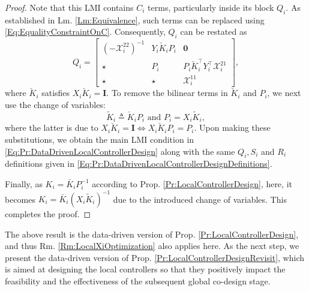 \documentclass[letterpaper, 10 pt, conference]{ieeeconf}%
\newcommand{\T}{\top}
\newcommand{\I}{\mathbf{I}}
\newcommand{\0}{\mathbf{0}}
\newcommand{\X}{\mathcal{X}}
\newcommand{\bm}[1]{\begin{bmatrix}#1\end{bmatrix}}
\begin{document}
\begin{proof}
Note that this LMI contains $C_i$ terms, particularly inside its block $Q_i$. As established in Lm. \ref{Lm:Equivalence}, such terms can be replaced using \eqref{Eq:EqualityConstraintOnC}. Consequently, $Q_i$ can be restated as   
$$
Q_i =  
\bm{ 
(-\X_i^{22})^{-1} & Y_i \check{K}_iP_i & \0 \\
\star & P_i  & P_i \check{K}_i^\T Y_i^\T \X^{21}_i\\
\star & \star & \X^{11}_i }, 
$$
where $\check{K}_i$ satisfies $X_i \check{K}_i = \I$. To remove the bilinear terms in $\check{K}_i$ and $P_i$, we next use the change of variables: 
$$
\tilde{K}_i \triangleq \check{K}_i P_i \mbox{ and } P_i = X_i \tilde{K}_i,
$$
where the latter is due to $X_i \check{K}_i = \I \iff X_i \check{K}_i P_i = P_i$. Upon making these substitutions, we obtain the main LMI condition in \eqref{Eq:Pr:DataDrivenLocalControllerDesign} along with the same $Q_i, S_i$ and $R_i$ definitions given in \eqref{Eq:Pr:DataDrivenLocalControllerDesignDefinitions}. 

Finally, as $K_i = \bar{K}_i P_i^{-1}$ according to Prop. \ref{Pr:LocalControllerDesign}, here, it becomes $K_i = \bar{K}_i (X_i \tilde{K}_i)^{-1}$ due to the introduced change of variables. This completes the proof.
\end{proof}
 

The above result is the data-driven version of Prop. \ref{Pr:LocalControllerDesign}, and thus Rm. \ref{Rm:LocalXiOptimization} also applies here. As the next step, we present the data-driven version of Prop.  \ref{Pr:LocalControllerDesignRevisit}, which is aimed at designing the local controllers so that they positively impact the feasibility and the effectiveness of the subsequent global co-design stage. 
\end{document}
